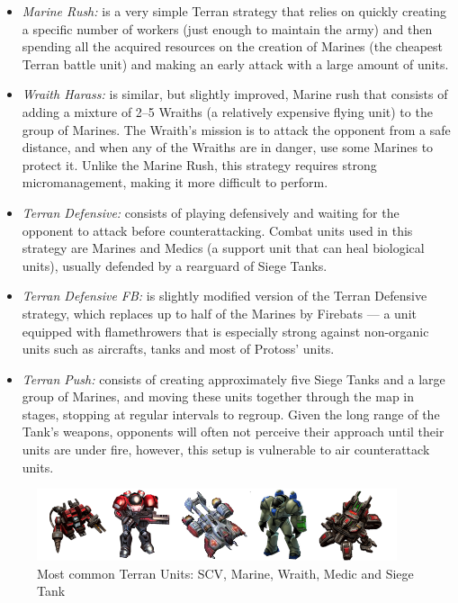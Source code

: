\begin{itemize}
\item \textit{Marine Rush:} is a very simple Terran strategy that relies on quickly creating a specific number of workers (just enough to maintain the army) and then spending all the acquired resources on the creation of Marines (the cheapest Terran battle unit) and making an early attack with a large amount of units.

\item \textit{Wraith Harass:} is similar, but slightly improved, Marine rush that consists of adding 
a mixture of 2--5 Wraiths (a relatively expensive flying unit) to the group of Marines. The Wraith's mission is to attack the opponent from a safe distance, and when any of the Wraiths are in danger,  use some Marines to protect it.
Unlike the Marine Rush, this strategy requires strong micromanagement, making it more difficult to perform. 

\item \textit{Terran Defensive:} consists of playing defensively and waiting for the opponent to attack before counterattacking. 
Combat units used in this strategy are Marines and Medics (a support unit that can heal biological units),
usually defended by a rearguard of Siege Tanks.

\item \textit{Terran Defensive FB:} is slightly modified version of the Terran Defensive strategy, which replaces up to half of the Marines by Firebats --- a unit equipped with flamethrowers that is 
especially strong against non-organic units such as aircrafts, tanks and most of Protoss' units.

\item \textit{Terran Push:} consists of creating approximately five Siege Tanks and a large group of Marines, and moving these units together through the map in stages, stopping at regular intervals to regroup. 
Given the long range of the Tank's weapons, opponents will often not perceive their approach until their units are under fire, however, this setup is vulnerable to air counterattack units. 
\end{itemize}

\begin{figure}[ht]
\centering
\includegraphics[width=400px]{images/units}
\caption{Most common Terran Units: SCV, Marine, Wraith, Medic and Siege Tank}
\label{fig:units}
\end{figure}

